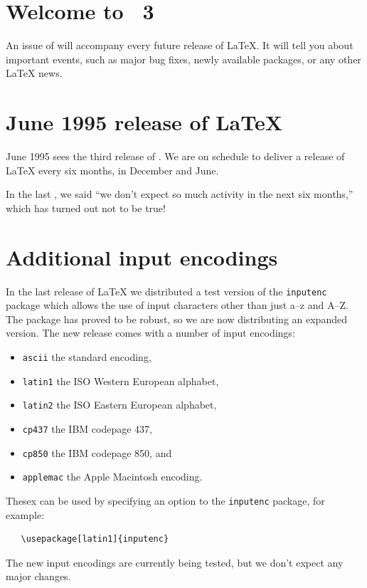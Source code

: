 \documentclass{ltnews}
\providecommand\pkg[1]{\texttt{#1}}
\providecommand\option[1]{\texttt{#1}}
\begin{document}
\maketitle

\section{Welcome to \LaTeXNews~3}

An issue of \emph{\LaTeXNews} will accompany every future release of
\LaTeX.  It will tell you about important events, such as major bug
fixes, newly available packages, or any other \LaTeX{} news.

\section{June 1995 release of \LaTeX}

June 1995 sees the third release of \LaTeXe.  We are on schedule
to deliver a release of \LaTeX{} every six months, in December and
June.

In the last \emph{\LaTeXNews}, we said ``we don't expect so much
activity in the next six months,'' which has turned out not to be
true!

\section{Additional input encodings}

In the last release of \LaTeX{} we distributed a test version of the
\pkg{inputenc} package which allows the use of input characters
other than just a--z and A--Z.  The package has proved to be robust,
so we are now distributing an expanded version.
The new release comes with a number of input encodings:

\begin{itemize}
\item \option{ascii} the standard encoding,
\item \option{latin1} the ISO Western European alphabet,
\item \option{latin2} the ISO Eastern European alphabet,
\item \option{cp437} the IBM codepage 437,
\item \option{cp850} the IBM codepage 850, and
\item \option{applemac} the Apple Macintosh encoding.
\end{itemize}
Thesex can be used by specifying an option to the \pkg{inputenc}
package, for example:
\begin{verbatim}
   \usepackage[latin1]{inputenc}
\end{verbatim}
The new input encodings are currently being tested, but we don't
expect any major changes.
\end{document}
